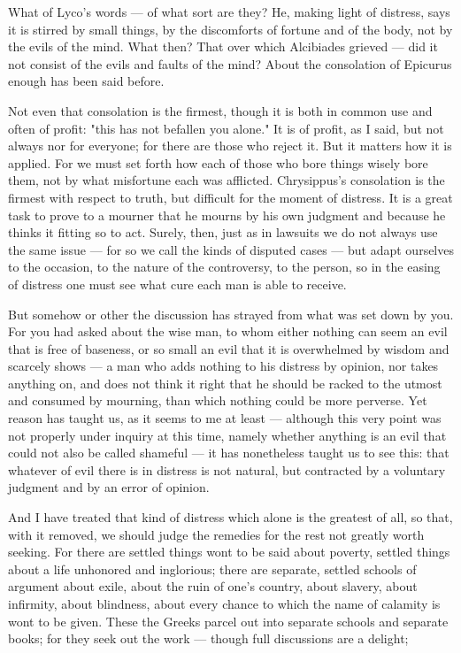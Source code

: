  What of Lyco's words — of what sort are they? He, making light of distress, says it is stirred by small things, by the discomforts of fortune and of the body, not by the evils of the mind. What then? That over which Alcibiades grieved — did it not consist of the evils and faults of the mind? About the consolation of Epicurus enough has been said before.

 Not even that consolation is the firmest, though it is both in common use and often of profit: "this has not befallen you alone." It is of profit, as I said, but not always nor for everyone; for there are those who reject it. But it matters how it is applied. For we must set forth how each of those who bore things wisely bore them, not by what misfortune each was afflicted. Chrysippus's consolation is the firmest with respect to truth, but difficult for the moment of distress. It is a great task to prove to a mourner that he mourns by his own judgment and because he thinks it fitting so to act. Surely, then, just as in lawsuits we do not always use the same issue — for so we call the kinds of disputed cases — but adapt ourselves to the occasion, to the nature of the controversy, to the person, so in the easing of distress one must see what cure each man is able to receive.

 But somehow or other the discussion has strayed from what was set down by you. For you had asked about the wise man, to whom either nothing can seem an evil that is free of baseness, or so small an evil that it is overwhelmed by wisdom and scarcely shows — a man who adds nothing to his distress by opinion, nor takes anything on, and does not think it right that he should be racked to the utmost and consumed by mourning, than which nothing could be more perverse. Yet reason has taught us, as it seems to me at least — although this very point was not properly under inquiry at this time, namely whether anything is an evil that could not also be called shameful — it has nonetheless taught us to see this: that whatever of evil there is in distress is not natural, but contracted by a voluntary judgment and by an error of opinion.

 And I have treated that kind of distress which alone is the greatest of all, so that, with it removed, we should judge the remedies for the rest not greatly worth seeking. For there are settled things wont to be said about poverty, settled things about a life unhonored and inglorious; there are separate, settled schools of argument about exile, about the ruin of one's country, about slavery, about infirmity, about blindness, about every chance to which the name of calamity is wont to be given. These the Greeks parcel out into separate schools and separate books; for they seek out the work — though full discussions are a delight;

